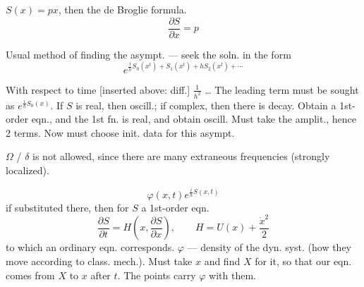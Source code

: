 $S(x)=px$, then the de Broglie formula.
\begin{equation*}
\frac{\partial S}{\partial x}=p
\end{equation*}
\par\noindent\begin{minipage}{\linewidth}
Usual method of finding the asympt. --- seek the soln. in the form
\begin{equation*}
e^{\frac{i}{h}S_0(x^t)+S_1(x^t)+hS_2(x^t)+\cdots}
\end{equation*}
\end{minipage}\par
With respect to time [inserted above: diff.] $\frac{1}{h^2}$ \ldots
The leading term must be sought as $e^{\frac{i}{h}S_0(x)}$.
If $S$ is real, then oscill.; if complex, then there is decay.
Obtain a 1st-order eqn., and the 1st fn. is real, and obtain oscill.
Must take the amplit., hence 2 terms.
Now must choose init. data for this asympt.
\par\noindent\begin{minipage}{\linewidth}
$\Omega$ / $\delta$ is not allowed, since there are many extraneous frequencies (strongly localized).
\end{minipage}\par
\begin{equation*}
\varphi(x,t)e^{\frac{i}{h}S(x,t)}
\end{equation*}
if substituted there, then for $S$ a 1st-order eqn.
\begin{equation*}
\frac{\partial S}{\partial t}
=H\left(x,\frac{\partial S}{\partial x}\right),
\qquad H=U(x)+\frac{\dot{x}^2}{2}
\end{equation*}
to which an ordinary eqn. corresponds.
$\varphi$ --- density of the dyn. syst. (how they move according to class. mech.).
Must take $x$ and find $X$ for it, so that
our eqn. comes from $X$ to $x$ after $t$.
The points carry $\varphi$ with them.
